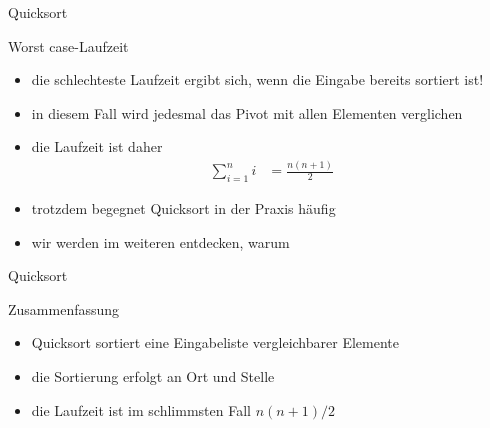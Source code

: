 \documentclass[aspectratio=1610, 11pt]{beamer}
\begin{document}
\begin{frame}{Quicksort}
\begin{exampleblock}{Worst case-Laufzeit}
	\begin{itemize}
		\item die schlechteste Laufzeit ergibt sich, wenn die Eingabe bereits sortiert ist!
		\item in diesem Fall wird jedesmal das Pivot mit allen Elementen verglichen
		\item die Laufzeit ist daher
			\begin{align*}
				\sum_{i=1}^ni&=\frac{n(n+1)}2
			\end{align*}
		\item trotzdem begegnet Quicksort in der Praxis h\"aufig
		\item wir werden im weiteren entdecken, warum
	\end{itemize}
	\end{exampleblock}
\end{frame}

\begin{frame}{Quicksort}
\begin{exampleblock}{Zusammenfassung}
	\begin{itemize}
		\item Quicksort sortiert eine Eingabeliste vergleichbarer Elemente
		\item die Sortierung erfolgt an Ort und Stelle
		\item die Laufzeit ist im schlimmsten Fall $n(n+1)/2$
	\end{itemize}
	\end{exampleblock}
\end{frame}
\end{document}

